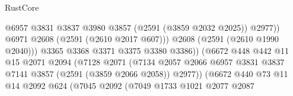 \begin{lexlean}{RustCore}
\begin{coremodule}
                                                  @6957
                                                  @3831
                                                  @3837
                                                  @3980
                                                  @3857
                                                  (@2591 (@3859 @2032 @2025))
                                                  @2977))
                                              @6971
                                              @2608
                                              (@2591 (@2610 @2017 @607)))
                                            @2608
                                            (@2591 (@2610 @1990 @2040)))
                                          @3365
                                          @3368
                                          @3371
                                          @3375
                                          @3380
                                          @3386))
                                      (@6672
                                        @448
                                        @442
                                        @11
                                        @15
                                        @2071
                                        @2094
                                        (@7128
                                          @2071
                                          (@7134
                                            @2057
                                            @2066
                                            @6957
                                            @3831
                                            @3837
                                            @7141
                                            @3857
                                            (@2591 (@3859 @2066 @2058))
                                            @2977))
                                        (@6672
                                          @440
                                          @73
                                          @11
                                          @14
                                          @2092
                                          @624
                                          (@7045
                                            @2092
                                            (@7049
                                              @1733
                                              @1021
                                              @2077
                                              @2087

\end{coremodule}
\end{lexlean}
